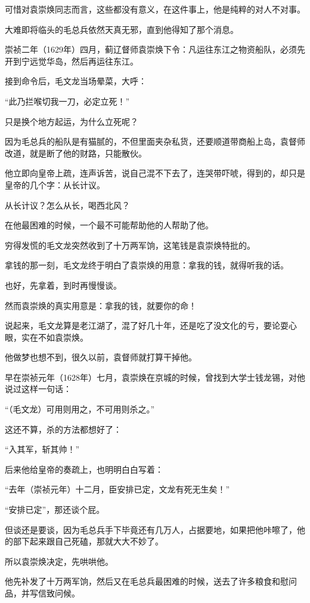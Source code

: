 \begin{multicols}{\theparacolNo}
		可惜对袁崇焕同志而言，这些都没有意义，在这件事上，他是纯粹的对人不对事。

		大难即将临头的毛总兵依然天真无邪，直到他得知了那个消息。

		崇祯二年（1629年）四月，蓟辽督师袁崇焕下令：凡运往东江之物资船队，必须先开到宁远觉华岛，然后再运往东江。

		接到命令后，毛文龙当场晕菜，大呼：

		“此乃拦喉切我一刀，必定立死！”

		只是换个地方起运，为什么立死呢？

		因为毛总兵的船队是有猫腻的，不但里面夹杂私货，还要顺道带商船上岛，袁督师改道，就是断了他的财路，只能散伙。

		他立即向皇帝上疏，连声诉苦，说自己混不下去了，连哭带吓唬，得到的，却只是皇帝的几个字：从长计议。

		从长计议？怎么从长，喝西北风？

		在他最困难的时候，一个最不可能帮助他的人帮助了他。

		穷得发慌的毛文龙突然收到了十万两军饷，这笔钱是袁崇焕特批的。

		拿钱的那一刻，毛文龙终于明白了袁崇焕的用意：拿我的钱，就得听我的话。

		也好，先拿着，到时再慢慢谈。

		然而袁崇焕的真实用意是：拿我的钱，就要你的命！

		说起来，毛文龙算是老江湖了，混了好几十年，还是吃了没文化的亏，要论耍心眼，实在不如袁崇焕。

		他做梦也想不到，很久以前，袁督师就打算干掉他。

		早在崇祯元年（1628年）七月，袁崇焕在京城的时候，曾找到大学士钱龙锡，对他说过这样一句话：

		“（毛文龙）可用则用之，不可用则杀之。”

		这还不算，杀的方法都想好了：

		“入其军，斩其帅！”

		后来他给皇帝的奏疏上，也明明白白写着：

		“去年（崇祯元年）十二月，臣安排已定，文龙有死无生矣！”

		“安排已定”，那还谈个屁。

		但谈还是要谈，因为毛总兵手下毕竟还有几万人，占据要地，如果把他咔嚓了，他的部下起来跟自己死磕，那就大大不妙了。

		所以袁崇焕决定，先哄哄他。

		他先补发了十万两军饷，然后又在毛总兵最困难的时候，送去了许多粮食和慰问品，并写信致问候。


\end{multicols}
